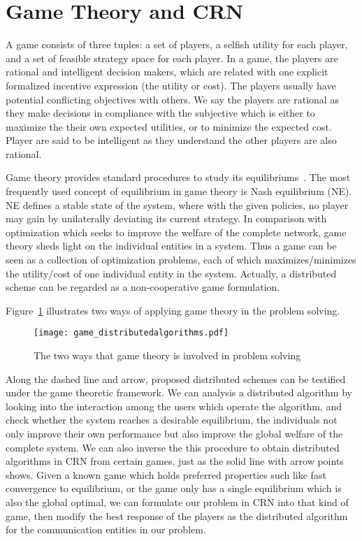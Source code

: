 \section{Game Theory and CRN}

A game consists of three tuples: a set of players, a selfish utility for each player, and a set of feasible strategy space for each player.
In a game, the players are rational and intelligent decision makers, which are related with one explicit formalized incentive expression (the utility or cost).
The players usually have potential conflicting objectives with others.
We say the players are rational as they make decisions in compliance with the subjective which is either to maximize the their own expected utilities, or to minimize the expected cost.
Player are said to be intelligent as they understand the other players are also rational.
%

Game theory provides standard procedures to study its equilibriums~\cite{game_for_communication_01}.
The most frequently used concept of equilibrium in game theory is Nash equilibrium (\gls{NE}).
NE defines a stable state of the system, where with the given policies, no player may gain by unilaterally deviating its current strategy.
In comparison with optimization which seeks to improve the welfare of the complete network, game theory sheds light on the individual entities in a system.
Thus a game can be seen as a collection of optimization problems, each of which maximizes/minimizes the utility/cost of one individual entity in the system.
Actually, a distributed scheme can be regarded as a non-cooperative game formulation. 


Figure~\ref{game_distributedalgorithms} illustrates two ways of applying game theory in the problem solving.
\begin{figure}[h!]
  \centering
  \texttt{[image: game\_distributedalgorithms.pdf]}
  \caption{The two ways that game theory is involved in problem solving}
\label{game_distributedalgorithms}
\end{figure}
Along the dashed line and arrow, proposed distributed schemes can be testified under the game theoretic framework.
We can analysis a distributed algorithm by looking into the interaction among the users which operate the algorithm, and check whether the system reaches a desirable equilibrium, \ie the individuals not only improve their own performance but also improve the global welfare of the complete system.
We can also inverse the this procedure to obtain distributed algorithms in CRN from certain games, just as the solid line with arrow points shows.
Given a known game which holds preferred properties such like fast convergence to equilibrium, or the game only has a single equilibrium which is also the global optimal, we can formulate our problem in CRN into that kind of game, then modify the best response of the players as the distributed algorithm for the communication entities in our problem. 



